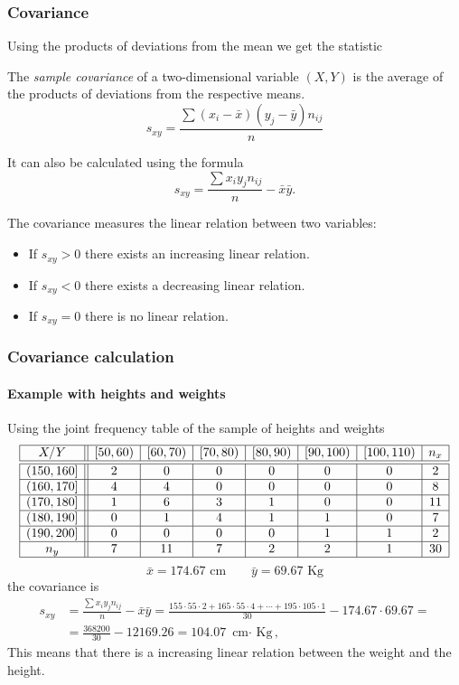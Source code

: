 \begin{frame}
\frametitle{Covariance}
Using the products of deviations from the mean we get the statistic
\begin{definition}
The \emph{sample covariance} of a two-dimensional variable $(X,Y)$ is the average of the products of deviations from
the respective means.
\[
s_{xy}=\frac{\sum (x_i-\bar x)(y_j-\bar y)n_{ij}}{n}
\]
\end{definition}
It can also be calculated using the formula 
\[
s_{xy}=\frac{\sum x_iy_jn_{ij}}{n}-\bar x\bar y.
\]

The covariance measures the linear relation between two variables:
\begin{itemize}
\item If $s_{xy}>0$ there exists an increasing linear relation.
\item If $s_{xy}<0$ there exists a decreasing linear relation.
\item If $s_{xy}=0$ there is no linear relation.
\end{itemize}
\end{frame}


\begin{frame}
\frametitle{Covariance calculation}
\framesubtitle{Example with heights and weights}
Using the joint frequency table of the sample of heights and weights
\[
\begin{array}{|c||c|c|c|c|c|c|c|}
\hline
  X/Y & [50,60) & [60,70) & [70,80) & [80,90) & [90,100) & [100,110) & n_x\\
  \hline\hline
  (150,160] & 2 & 0 & 0 & 0 & 0 & 0 & 2\\
  \hline
  (160,170] & 4 & 4 & 0 & 0 & 0 & 0 & 8\\
  \hline
  (170,180] & 1 & 6 & 3 & 1 & 0 & 0 & 11 \\
  \hline
  (180,190] & 0 & 1 & 4 & 1 & 1 & 0 & 7 \\
  \hline
  (190,200] & 0 & 0 & 0 & 0 & 1 & 1 & 2\\
  \hline
  n_y & 7 & 11 & 7 & 2 & 2 & 1 & 30\\
  \hline
\end{array}
\]
\[
\bar x = 174.67 \mbox{ cm} \qquad \bar y = 69.67 \mbox{ Kg}
\]
the covariance is 
\begin{align*}
s_{xy} &=\frac{\sum x_iy_jn_{ij}}{n}-\bar x\bar y =  \frac{155\cdot 55\cdot 2 + 165\cdot 55\cdot 4 + \cdots + 195\cdot 105\cdot 1}{30}-174.67\cdot 69.67 =\\
& = \frac{368200}{30}-12169.26 = 104.07 \mbox{ cm$\cdot$ Kg},
\end{align*}
This means that there is a increasing linear relation between the weight and the height.
\end{frame}


